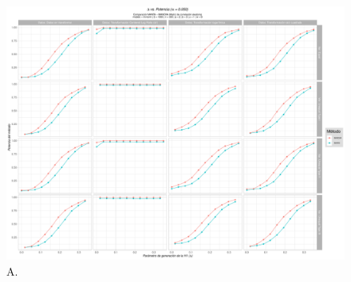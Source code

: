 \documentclass[IB,BIB]{TFUOC}%
\begin{document}
\begin{figure}[!htbp]
\hspace*{-1.6cm} %
    \centering
    \includegraphics[scale=.51]{OBJ1bALEAT005.pdf}
    \caption{\scriptsize{A.}}
    \label{figAppend:OBJ1bALEAT005}
\end{figure}
\end{document}
